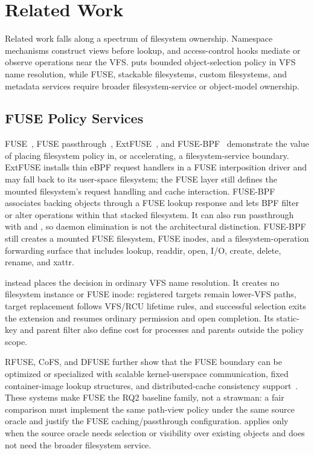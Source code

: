 \section{Related Work}
\label{sec:related-work}

Related work falls along a spectrum of filesystem ownership. Namespace
mechanisms construct views before lookup, and access-control hooks mediate or
observe operations near the VFS. \namei puts bounded object-selection policy in
VFS name resolution, while FUSE, stackable filesystems, custom filesystems, and
metadata services require broader filesystem-service or object-model ownership.

\subsection{FUSE Policy Services}

FUSE~\cite{linux_fuse}, FUSE passthrough~\cite{linux_fuse_passthrough},
ExtFUSE~\cite{extfuse}, and FUSE-BPF~\cite{fuse_bpf_patch} demonstrate the
value of placing filesystem policy in, or accelerating, a filesystem-service
boundary. ExtFUSE installs thin eBPF request handlers in a FUSE interposition
driver and may fall back to its user-space filesystem; the FUSE layer still
defines the mounted filesystem's request handling and cache interaction.
FUSE-BPF associates backing objects through a FUSE lookup response and lets BPF
filter or alter operations within that stacked filesystem. It can also run
passthrough with  and , so daemon elimination is
not the architectural distinction. FUSE-BPF still creates a mounted FUSE
filesystem, FUSE inodes, and a filesystem-operation forwarding surface that
includes lookup, readdir, open, I/O, create, delete, rename, and xattr.

\namei instead places the decision in ordinary VFS name resolution. It creates
no filesystem instance or FUSE inode: registered targets remain lower-VFS
paths, target replacement follows VFS/RCU lifetime rules, and successful
selection exits the extension and resumes ordinary permission and open
completion. Its static-key and parent filter also define cost for processes and
parents outside the policy scope.

RFUSE, CoFS, and DFUSE further show that the FUSE boundary can be
optimized or specialized with scalable kernel-userspace communication, fixed
container-image lookup structures, and distributed-cache consistency
support~\cite{rfuse_fast24,cofs_fast26,distfuse_arxiv25}. These systems make
FUSE the RQ2 baseline family, not a strawman: a fair comparison must implement
the same path-view policy under the same source oracle and justify the FUSE
caching/passthrough configuration. \namei applies only when the source oracle
needs selection or visibility over existing objects and does not need the
broader filesystem service.

